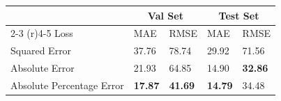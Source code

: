 \begin{tabular}{lllll}
\toprule
  & \multicolumn{2}{c}{Val Set} & \multicolumn{2}{c}{Test Set} \\
  \cmidrule(r){2-3} \cmidrule(r){4-5}
 Loss & MAE & RMSE & MAE & RMSE
 \\
 \midrule
Squared Error & 37.76 & 78.74 & 29.92 & 71.56\\
Absolute Error & 21.93 & 64.85 & 14.90 & \textbf{32.86} \\
Absolute Percentage Error & \textbf{17.87}  & \textbf{41.69} &  \textbf{14.79} & 34.48\\
\bottomrule
\end{tabular}

 



